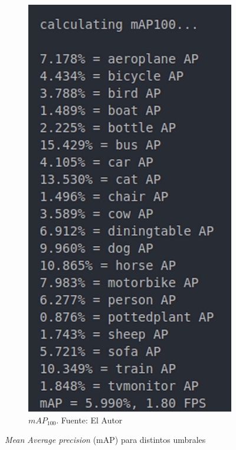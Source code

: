 \begin{figure}[H]
\begin{subfigure}[b]{0.4\textwidth}
     \end{subfigure}
     \hfill
     \begin{subfigure}[b]{0.4\textwidth}
         \centering
        \includegraphics[scale=0.15]{Recursos/mAP100_result.jpg}
        \caption[$mAP_{100}$.]{$mAP_{100}$. {\footnotesize Fuente: El Autor}}
        \label{mAP_100_result}
     \end{subfigure}
\caption{\textit{Mean Average precision} (mAP) para distintos umbrales}
\label{mAP_results}
\end{figure}
